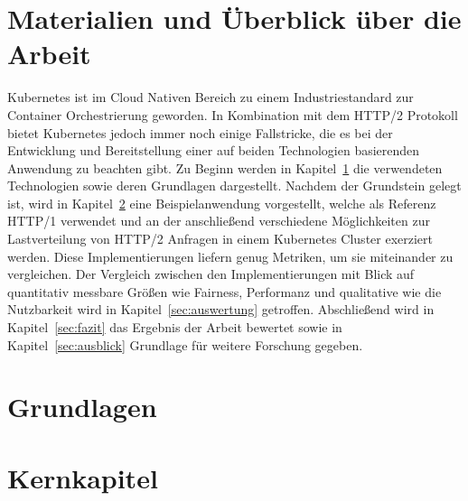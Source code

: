\documentclass[a4paper,12pt]{article}
\begin{document}

    \frontmatter

    \tableofcontents

    \newpage

    \section*{Materialien und Überblick über die Arbeit}
    Kubernetes ist im Cloud Nativen Bereich zu einem Industriestandard zur Container Orchestrierung geworden.
    In Kombination mit dem HTTP/2 Protokoll bietet Kubernetes jedoch immer noch einige Fallstricke, die es bei der Entwicklung und Bereitstellung einer auf beiden Technologien basierenden Anwendung zu beachten gibt.
    Zu Beginn werden in Kapitel~\ref{sec:grundlagen} die verwendeten Technologien sowie deren Grundlagen dargestellt.
    Nachdem der Grundstein gelegt ist, wird in Kapitel~\ref{sec:kernkapitel} eine Beispielanwendung vorgestellt, welche als Referenz HTTP/1 verwendet und an der anschließend verschiedene Möglichkeiten zur Lastverteilung von HTTP/2 Anfragen in einem Kubernetes Cluster exerziert werden.
    Diese Implementierungen liefern genug Metriken, um sie miteinander zu vergleichen.
    Der Vergleich zwischen den Implementierungen mit Blick auf quantitativ messbare Größen wie Fairness, Performanz und qualitative wie die Nutzbarkeit wird in Kapitel~\ref{sec:auswertung} getroffen.
    Abschließend wird in Kapitel~\ref{sec:fazit} das Ergebnis der Arbeit bewertet sowie in Kapitel~\ref{sec:ausblick} Grundlage für weitere Forschung gegeben.
    \newpage

    \mainmatter


    \section{Grundlagen}\label{sec:grundlagen}
    


    \section{Kernkapitel}\label{sec:kernkapitel}
    
\end{document}
